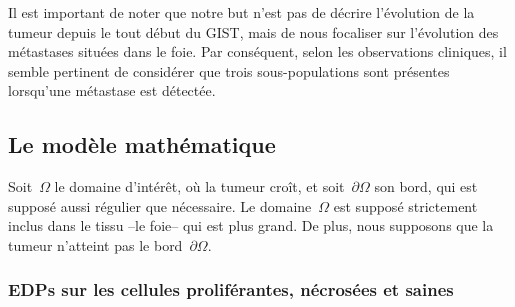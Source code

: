 \documentclass[main.tex]{subfiles}
\begin{document}
Il est important de noter que notre but n'est pas de décrire l'évolution de la tumeur depuis le tout début du GIST, mais de nous focaliser sur l'évolution des métastases situées dans le foie. 
Par conséquent, selon les observations cliniques, il semble pertinent de considérer que trois sous-populations sont présentes lorsqu'une métastase est détectée.

\subsection{Le modèle mathématique}

Soit~$\Omega$ le domaine d'intérêt, où la tumeur croît, et soit~$\partial\Omega$ son bord, qui est supposé aussi régulier que nécessaire. Le domaine~$\Omega$ est supposé strictement inclus dans le tissu --le foie-- qui est plus grand. De plus, nous supposons que la tumeur n'atteint pas le bord~$\partial\Omega$.

\subsubsection{EDPs sur les cellules proliférantes, nécrosées et saines}
\end{document}

